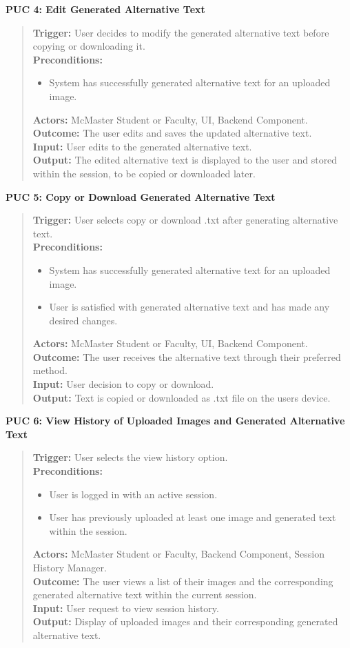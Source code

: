 \documentclass[12pt]{article}
\begin{document}
\textbf{PUC 4: Edit Generated Alternative Text}
\begin{quote}
\textbf{Trigger:} User decides to modify the generated alternative text before copying or downloading it.\\
\textbf{Preconditions:}
\begin{itemize}
  \item System has successfully generated alternative text for an uploaded image.
\end{itemize}
\textbf{Actors:} McMaster Student or Faculty, UI, Backend Component.\\
\textbf{Outcome:} The user edits and saves the updated alternative text. \\
\textbf{Input:} User edits to the generated alternative text.\\
\textbf{Output:} The edited alternative text is displayed to the user and stored within the session, to be copied or downloaded later.
\end{quote}
\textbf{PUC 5: Copy or Download Generated Alternative Text }
\begin{quote}
\textbf{Trigger:} User selects copy or download .txt after generating alternative text.\\
\textbf{Preconditions:}
\begin{itemize}
  \item System has successfully generated alternative text for an uploaded image.
  \item User is satisfied with generated alternative text and has made any desired changes. 
\end{itemize}
\textbf{Actors:} McMaster Student or Faculty, UI, Backend Component.\\
\textbf{Outcome:} The user receives the alternative text through their preferred method. \\
\textbf{Input:} User decision to copy or download.\\
\textbf{Output:} Text is copied or downloaded as .txt file on the users device.
\end{quote}
\textbf{PUC 6: View History of Uploaded Images and Generated Alternative Text}
\begin{quote}
  \textbf{Trigger:} User selects the view history option.\\
  \textbf{Preconditions:}
  \begin{itemize}
    \item User is logged in with an active session.
    \item User has previously uploaded at least one image and
      generated text within the session.
  \end{itemize}
  \textbf{Actors:} McMaster Student or Faculty, Backend Component, Session History Manager.\\
  \textbf{Outcome:} The user views a list of their images and the
  corresponding generated alternative text within the current session. \\
  \textbf{Input:} User request to view session history.\\
  \textbf{Output:} Display of uploaded images and their corresponding
  generated alternative text.\\
\end{quote}
\end{document}
